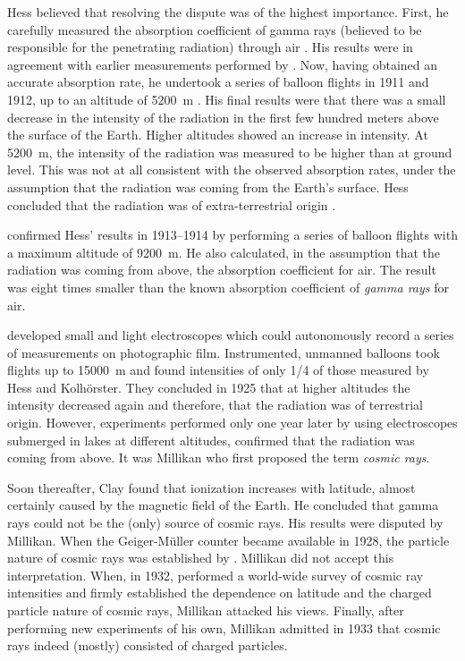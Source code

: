 Hess believed that resolving the dispute was of the highest importance.  First,
he carefully measured the absorption coefficient of gamma rays (believed
to be responsible for the penetrating radiation) through air \cite{Hess:1911}.
His results were in agreement with earlier measurements performed by
\textcite{Eve:1911}.  Now, having obtained an accurate absorption rate, he undertook a
series of balloon flights in 1911 and 1912, up to an altitude of
\SI{5200}{\meter} \cite{Hess:1912}.  His final results were that there was a
small decrease in the intensity of the radiation in the first few hundred meters above the
surface of the Earth.  Higher altitudes showed an increase in intensity. At
\SI{5200}{\meter}, the intensity of the radiation  was measured to be higher than at
ground level.  This was not at all consistent with the observed absorption
rates, under the assumption that the radiation was coming from the Earth's surface.  Hess concluded that the
radiation was of extra-terrestrial origin \cite{Hess:1913}.

\textcite{Kolhorster:1913} confirmed Hess' results in 1913--1914 by performing a
series of balloon flights with a maximum altitude of \SI{9200}{\meter}.  He also
calculated, in the assumption that the radiation was coming from above, the
absorption coefficient for air.  The result was eight times smaller than the
known absorption coefficient of \emph{gamma rays} for air.

\textcite{MillikanBowen:1923} developed small and light electroscopes which
could autonomously record a series of measurements on photographic film.
Instrumented, unmanned balloons took flights up to \SI{15000}{\meter} and found
intensities of only \num{1/4} of those measured by Hess and Kolhörster.  They
concluded in 1925 that at higher altitudes the intensity decreased again and
therefore, that the radiation was of terrestrial origin.  However, experiments
performed only one year later by \textcite{MillikanCameron:1926} using
electroscopes submerged in lakes at different altitudes, confirmed that the
radiation was coming from above.
It was Millikan who first proposed the term \emph{cosmic rays}.

Soon thereafter, Clay \cites{Clay:1927}{Clay:1928} found that ionization
increases with latitude, almost certainly caused by the magnetic field of the
Earth.  He concluded that gamma rays could not be the (only) source of cosmic
rays.  His results were disputed by Millikan.  When the Geiger-Müller counter
became available in 1928, the particle nature of cosmic rays was established by
\textcite{BotheKolhorster:1929}.
Millikan did not accept this interpretation.  When, in 1932,
\textcite{Compton:1933} performed a world-wide survey of cosmic ray intensities
and firmly established the dependence on latitude and the charged particle
nature of cosmic rays, Millikan attacked his views.  Finally, after performing
new experiments of his own, Millikan admitted in 1933 that cosmic rays indeed
(mostly) consisted of charged particles.

